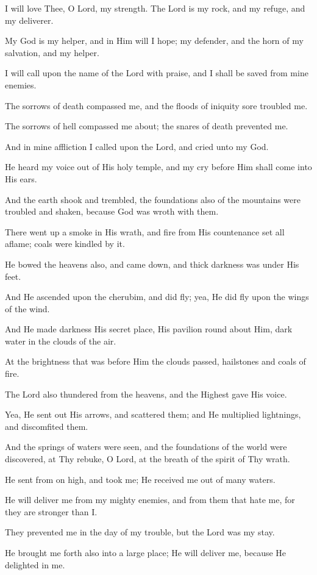 I will love Thee, O Lord, my strength. The Lord is my rock, and my refuge, and my deliverer.

My God is my helper, and in Him will I hope; my defender, and the horn of my salvation, and my helper.

I will call upon the name of the Lord with praise, and I shall be saved from mine enemies.

The sorrows of death compassed me, and the floods of iniquity sore troubled me.

The sorrows of hell compassed me about; the snares of death prevented me.

And in mine affliction I called upon the Lord, and cried unto my God.

He heard my voice out of His holy temple, and my cry before Him shall come into His ears.

And the earth shook and trembled, the foundations also of the mountains were troubled and shaken, because God was wroth with them.

There went up a smoke in His wrath, and fire from His countenance set all aflame; coals were kindled by it.

He bowed the heavens also, and came down, and thick darkness was under His feet.

And He ascended upon the cherubim, and did fly; yea, He did fly upon the wings of the wind.

And He made darkness His secret place, His pavilion round about Him, dark water in the clouds of the air.

At the brightness that was before Him the clouds passed, hailstones and coals of fire.

The Lord also thundered from the heavens, and the Highest gave His voice.

Yea, He sent out His arrows, and scattered them; and He multiplied lightnings, and discomfited them.

And the springs of waters were seen, and the foundations of the world were discovered, at Thy rebuke, O Lord, at the breath of the spirit of Thy wrath.

He sent from on high, and took me; He received me out of many waters.

He will deliver me from my mighty enemies, and from them that hate me, for they are stronger than I.

They prevented me in the day of my trouble, but the Lord was my stay.

He brought me forth also into a large place; He will deliver me, because He delighted in me.

